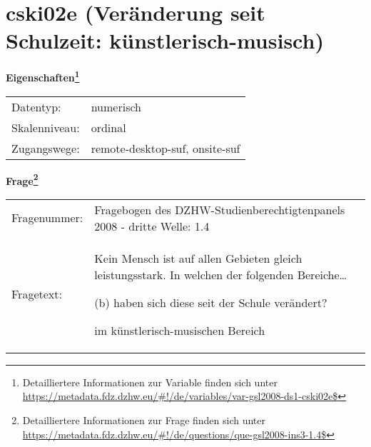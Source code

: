 
    \setcounter{footnote}{0}

    \vspace*{-1.8cm}
	\section{cski02e (Veränderung seit Schulzeit: künstlerisch-musisch)}
	\label{section:cski02e}



    \vspace*{0.5cm}
    \noindent\textbf{Eigenschaften\footnote{Detailliertere Informationen zur Variable finden sich unter
		\url{https://metadata.fdz.dzhw.eu/\#!/de/variables/var-gsl2008-ds1-cski02e$}}}\\
	\begin{tabularx}{\hsize}{@{}lX}
	Datentyp: & numerisch \\
	Skalenniveau: & ordinal \\
	Zugangswege: &
	  remote-desktop-suf, 
	  onsite-suf
 \\
    \end{tabularx}



				\vspace*{0.5cm}
                \noindent\textbf{Frage\footnote{Detailliertere Informationen zur Frage finden sich unter
		              \url{https://metadata.fdz.dzhw.eu/\#!/de/questions/que-gsl2008-ins3-1.4$}}}\\
				\begin{tabularx}{\hsize}{@{}lX}
					Fragenummer: &
					  Fragebogen des DZHW-Studienberechtigtenpanels 2008 - dritte Welle:
					  1.4
 \\
					Fragetext: & Kein Mensch ist auf allen Gebieten gleich leistungsstark. In welchen der folgenden Bereiche…\par  (b) haben sich diese seit der Schule verändert?\par  im künstlerisch-musischen Bereich \\
				\end{tabularx}





